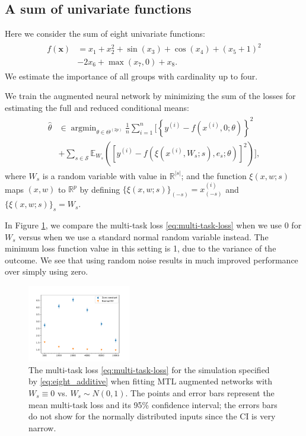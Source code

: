 \documentclass{article}
\DeclareMathOperator{\argmin}{\arg\min}
\begin{document}
\subsection{A sum of univariate functions}

Here we consider the sum of eight univariate functions:
\begin{align}
\begin{split}
f(\boldsymbol{x}) &= x_1 + x_2^2 + \sin(x_3) + \cos(x_4) + (x_5 + 1)^2\\
& - 2x_6 + \max(x_7, 0) + x_8.
\end{split}
\label{eq:eight_additive}
\end{align}
We estimate the importance of all groups with cardinality up to four.

We train the augmented neural network by minimizing the sum of the losses for estimating the full and reduced conditional means:
\begin{align}
\begin{split}
\hat{\theta} &\in \argmin_{\theta \in \Theta^{(2p)}} \frac{1}{n} \sum_{i=1}^n 
\bigg[
\left\{y^{(i)} - f(x^{(i)}, 0; \theta)\right\}^2
\\
&+ \sum_{s \in \mathcal{S}}
\mathbb{E}_{W_s}\left(
\left[y^{(i)} - f(\xi(x^{(i)}, W_s;s), e_s; \theta)\right]^2
\right)
\bigg ],
\end{split}
\label{eq:multi-task-loss}
\end{align}
where $W_s$ is a random variable with value in $\mathbb{R}^{|s|}$; and the function $\xi(x, w; s)$ maps $(x, w)$ to $\mathbb{R}^{p}$ by defining $\{\xi(x, w; s)\}_{(-s)} = x^{(i)}_{(-s)}$ and $\{\xi(x, w; s)\}_s = W_s$.

In Figure \ref{fig:zero_vs_random}, we compare the multi-task loss \eqref{eq:multi-task-loss} when we use 0 for $W_s$ versus when we use a standard normal random variable instead. The minimum loss function value in this setting is 1, due to the variance of the outcome. We see that using random noise results in much improved performance over simply using zero.

\begin{figure}
\includegraphics[width=0.4\textwidth]{images/compare_zero_v_random}
\caption{
The multi-task loss \eqref{eq:multi-task-loss} for the simulation specified by \eqref{eq:eight_additive} when fitting MTL augmented networks with $W_s \equiv 0$ vs. $W_s \sim N(0,1)$. The points and error bars represent the mean multi-task loss and its 95\% confidence interval; the errors bars do not show for the normally distributed inputs since the CI is very narrow.
}
\label{fig:zero_vs_random}
\end{figure}
\end{document}
